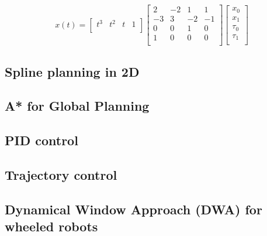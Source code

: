\begin{equation}
x(t) = \left[
 \begin{array}{cccc}
  t^3 & t^2 & t & 1 \\
 \end{array}
 \right]
 \left[
 \begin{array}{cccc}
  2 & -2 & 1 & 1 \\
  -3 & 3 & -2 & -1\\
  0 & 0 & 1 & 0 \\
  1 & 0 & 0 & 0 \\
 \end{array}
 \right]
 \left[
 \begin{array}{c}
  x_0 \\
  x_1\\
  \tau_0 \\
  \tau_1\\
 \end{array}
 \right]
\end{equation}




\subsection{Spline planning in 2D}

\subsection{A* for Global Planning}

\subsection{PID control}

\subsection{Trajectory control}

\subsection{Dynamical Window Approach (DWA) for wheeled robots}
